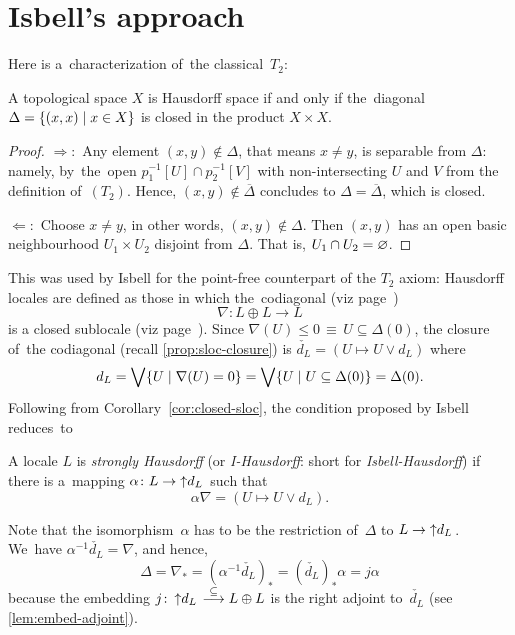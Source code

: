 \section{Isbell's approach}

Here is a~characterization of~the classical~$T_2$:

\begin{prop}
  A topological space $X$ is Hausdorff space if and only if the~diagonal
  $\Delta = \left\{(x, x) \mid x\in X \right\}$ is closed in the product
  $X\times X$.
\end{prop}

\begin{proof}
  $\Rightarrow:$ Any element $(x, y)\not\in \Delta$, that means $x \ne y$, is
  separable from $\Delta$:
  namely, by~the~open $p_1^{-1}[U] \cap p_2^{-1}[V]$ with non-intersecting $U$
  and $V$ from the definition of~$(T_2)$.
  Hence, $(x, y)\not\in \overline{\Delta}$ concludes to $\Delta =
  \overline{\Delta}$, which is closed.

  $\Leftarrow:$ Choose $x \ne y$, in other words, $(x, y)\not\in \Delta$.
  Then $(x, y)$ has an open basic neighbourhood $U_1\times U_2$ disjoint from
  $\Delta$.
  That is, $U_1 \cap U_2 = \varnothing$.
\end{proof}

This was used by Isbell \cite{isbell72} for the point-free counterpart of the
$T_2$ axiom:
Hausdorff locales are defined as those in which the~codiagonal (viz
page~\pageref{codiag-in-Frm})
\[
  \nabla\colon L \oplus L \to L
\]
is a closed sublocale (viz page~\pageref{df:closed-sloc}).
Since $\nabla(U) \le 0 \, \equiv \, U \subseteq \Delta(0)$, the closure of~the
codiagonal (recall \ref{prop:sloc-closure}) is $\check{d_L} = (U
\mapsto U \vee d_L)$ where
\[
  d_L
  = \bigvee \{ U \mid \nabla(U) = 0 \}
  = \bigvee \{ U \mid U \subseteq \Delta(0) \}
  = \Delta(0).
\]
Following from Corollary~\ref{cor:closed-sloc}, the condition proposed by
Isbell reduces~to

\begin{framed}
  \begin{df}[I-Haus]
    A locale $L$ is \emph{strongly Hausdorff\/} (or \emph{I-Hausdorff}: short
    for \emph{Isbell-Hausdorff}) if there is a~mapping $\alpha\colon L \to
    \left\uparrow d_L \right.$ such that
    \[
      \alpha \nabla = (U \mapsto U \vee d_L).
    \]
  \end{df}
\end{framed}

Note that the isomorphism~$\alpha$ has to be the restriction of~$\Delta$ to $L
\to \left\uparrow d_L \right.$.
We~have $\alpha^{-1} \check{d_L} = \nabla$, and hence,
\[
\Delta
= \nabla_*
= (\alpha^{-1} \check{d_L})_*
= (\check{d_L})_* \alpha
= j \alpha
\]
because the embedding $j\colon \dL \embed L \oplus L$ is the right adjoint
to~$\check{d_L}$ (see \ref{lem:embed-adjoint}).


